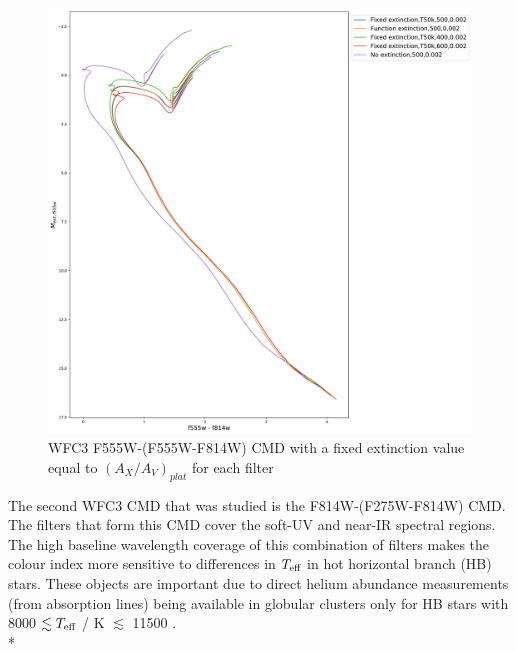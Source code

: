 \documentclass[12pt, a4paper]{report}
\begin{document}
\begin{figure}[h]
\begin{center}
\includegraphics[width=1.0\textwidth]{../basti_isochrones_10_13Gyr/Extinction_T50k_FeH0fix_func_f555w_f555wmf814w_500_400_600_Myr_FeH_0p002_ref_noext_Av_1p0.pdf}
\caption{WFC3 F555W-(F555W-F814W) CMD with a fixed extinction value equal to $(A_{X}/A_{V})_{plat}$ for each filter}
\label{wfc3_isoc1_T50k}
\end{center}
\end{figure}

The second WFC3 CMD that was studied is the F814W-(F275W-F814W) CMD. The filters that form this CMD cover the soft-UV and near-IR spectral regions. The high baseline wavelength coverage of this combination of filters makes the colour index more sensitive to differences in $T_{\textnormal{eff}}$ in hot horizontal branch (HB) stars. These objects are important due to direct helium abundance measurements (from absorption lines) being available in globular clusters only for HB stars with 8000 $\lesssim T_{\textnormal{eff}}$ / K $\lesssim$ 11500 \citep{2018MNRAS.475.4088L}. \\*
\end{document}
